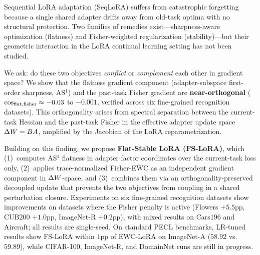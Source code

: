 Sequential LoRA adaptation (SeqLoRA) suffers from catastrophic forgetting because a single
shared adapter drifts away from old-task optima with no structural protection.
Two families of remedies exist---sharpness-aware optimization (flatness) and
Fisher-weighted regularization (stability)---but their geometric interaction in the LoRA
continual learning setting has not been studied.

We ask: do these two objectives \emph{conflict} or \emph{complement} each other in gradient space?
We show that the flatness gradient component (adapter-subspace first-order sharpness, AS$^1$)
and the past-task Fisher gradient are \textbf{near-orthogonal}
($\cos_{\mathrm{flat,fisher}} \approx -0.03$ to $-0.001$, verified across six fine-grained recognition datasets).
This orthogonality arises from spectral separation between the current-task Hessian
and the past-task Fisher in the effective adapter update space $\Delta W = BA$,
amplified by the Jacobian of the LoRA reparametrization.

Building on this finding, we propose \textbf{Flat-Stable LoRA (FS-LoRA)},
which (1)~computes AS$^1$ flatness in adapter factor coordinates over the current-task loss only,
(2)~applies trace-normalized Fisher-EWC as an independent gradient component in $\Delta W$-space,
and (3)~combines them via an orthogonality-preserved decoupled update that prevents the
two objectives from coupling in a shared perturbation closure.
Experiments on six fine-grained recognition datasets show improvements on datasets where
the Fisher penalty is active (Flowers $+5.5$pp, CUB200 $+1.0$pp, ImageNet-R $+0.2$pp),
with mixed results on Cars196 and Aircraft; all results are single-seed.
On standard PECL benchmarks, LR-tuned results show FS-LoRA within $1$pp of EWC-LoRA
on ImageNet-A ($58.92$ vs.~$59.89$), while CIFAR-100, ImageNet-R, and DomainNet
runs are still in progress.
